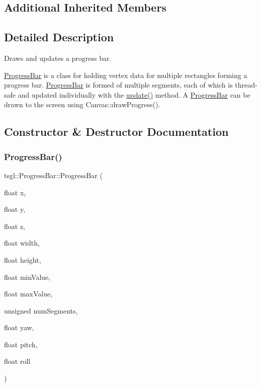 \subsection*{Additional Inherited Members}


\subsection{Detailed Description}
Draws and updates a progress bar. 

\hyperlink{classtsgl_1_1_progress_bar}{Progress\+Bar} is a class for holding vertex data for multiple rectangles forming a progress bar. \hyperlink{classtsgl_1_1_progress_bar}{Progress\+Bar} is formed of multiple segments, each of which is thread-\/safe and updated individually with the \hyperlink{classtsgl_1_1_progress_bar_a4274998e4935f33eb9212b2174d9c0c5}{update()} method. A \hyperlink{classtsgl_1_1_progress_bar}{Progress\+Bar} can be drawn to the screen using Canvas\+::draw\+Progress(). 

\subsection{Constructor \& Destructor Documentation}
\mbox{\label{classtsgl_1_1_progress_bar_a281955835a4dca417e17b8c158d3b907}} 
\subsubsection{\texorpdfstring{Progress\+Bar()}{ProgressBar()}}
{\footnotesize\ttfamily tsgl\+::\+Progress\+Bar\+::\+Progress\+Bar (\begin{DoxyParamCaption}\item[{float}]{x,  }\item[{float}]{y,  }\item[{float}]{z,  }\item[{float}]{width,  }\item[{float}]{height,  }\item[{float}]{min\+Value,  }\item[{float}]{max\+Value,  }\item[{unsigned}]{num\+Segments,  }\item[{float}]{yaw,  }\item[{float}]{pitch,  }\item[{float}]{roll }\end{DoxyParamCaption})}



